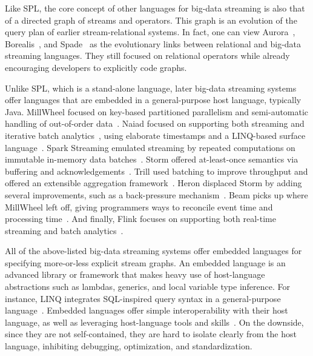 \vspace*{-0.3mm}
Like SPL, the core concept of other languages for big-data streaming
is also that of a directed graph of streams and operators. This graph
is an evolution of the query plan of earlier stream-relational
systems. In fact, one can view \textsf{Aurora}~\cite{abadi_et_al_2003},
\textsf{Borealis}~\cite{abadi_et_al_2005}, and
\textsf{Spade}~\cite{gedik_et_al_2008} as the evolutionary links
between relational and big-data streaming languages. They still focused
on relational operators while already encouraging developers to
explicitly code graphs.

\vspace*{-0.3mm}
Unlike SPL, which is a stand-alone language, later big-data streaming
systems offer languages that are embedded in a general-purpose host
language, typically Java. \textsf{MillWheel} focused on key-based
partitioned parallelism and semi-automatic handling of out-of-order
data~\cite{akidau_et_al_2013}. \textsf{Naiad} focused on supporting
both streaming and iterative batch analytics~\cite{murray_et_al_2013},
using elaborate timestamps and a LINQ-based surface
language~\cite{meijer_beckman_bierman_2006}.  \textsf{Spark Streaming}
emulated streaming by repeated computations on immutable in-me\-mo\-ry
data batches~\cite{zaharia_et_al_2013}. \textsf{Storm} offered
at-least-once semantics via buffering and
acknowledgements~\cite{toshniwal_et_al_2014}.  \textsf{Trill} used
batching to improve throughput and offered an extensible
aggregation framework~\cite{chandramouli_et_al_2014}.  \textsf{Heron}
displaced Storm by adding several improvements, such as a back-pressure
mechanism~\cite{kulkarni_et_al_2015}. \textsf{Beam} picks up where
MillWheel left off, giving programmers ways to reconcile event time
and processing time~\cite{akidau_et_al_2015}. And finally,
\textsf{Flink} focuses on supporting both real-time streaming and batch
analytics~\cite{carbone_et_al_2015}.

\vspace*{-0.3mm}
All of the above-listed big-data streaming systems offer embedded
languages for specifying more-or-less explicit stream graphs. An
embedded language is an advanced library or framework that makes heavy
use of host-language abstractions such as lambdas, generics, and local
variable type inference. For instance, LINQ integrates SQL-inspired
query syntax in a general-purpose
language~\cite{meijer_beckman_bierman_2006}.  Embedded languages
offer simple interoperability with their host language, as well
as leveraging host-language tools and skills~\cite{hudak_1998}. On the
downside, since they are not self-contained, they are hard to isolate
clearly from the host language, inhibiting debugging, optimization,
and standardization.
